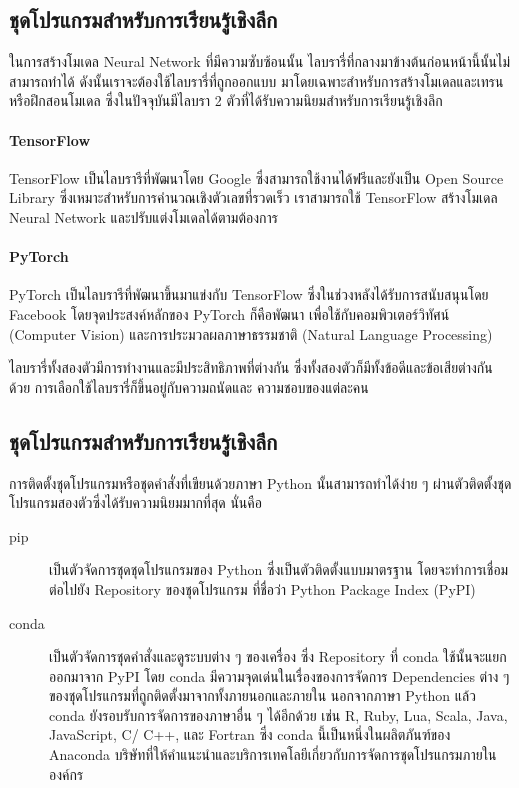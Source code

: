 \subsection{ชุดโปรแกรมสำหรับการเรียนรู้เชิงลึก}

ในการสร้างโมเดล Neural Network ที่มีความซับซ้อนนั้น ไลบรารี่ที่กลางมาข้างต้นก่อนหน้านี้นั้นไม่สามารถทำได้ ดังนั้นเราจะต้องใช้ไลบรารี่ที่ถูกออกแบบ%
มาโดยเฉพาะสำหรับการสร้างโมเดลและเทรนหรือฝึกสอนโมเดล ซึ่งในปัจจุบันมีไลบรา 2 ตัวที่ได้รับความนิยมสำหรับการเรียนรู้เชิงลึก 

\paragraph{TensorFlow}
TensorFlow เป็นไลบรารีที่พัฒนาโดย Google ซึ่งสามารถใช้งานได้ฟรีและยังเป็น Open Source Library ซึ่งเหมาะสำหรับการคำนวณเชิงตัวเลขที่รวดเร็ว 
เราสามารถใช้ TensorFlow สร้างโมเดล Neural Network และปรับแต่งโมเดลได้ตามต้องการ

\paragraph{PyTorch} 
PyTorch เป็นไลบรารีที่พัฒนาขึ้นมาแข่งกับ TensorFlow ซึ่งในช่วงหลังได้รับการสนับสนุนโดย Facebook โดยจุดประสงค์หลักของ PyTorch ก็คือพัฒนา%
เพื่อใช้กับคอมพิวเตอร์วิทัศน์ (Computer Vision) และการประมวลผลภาษาธรรมชาติ (Natural Language Processing) 

ไลบรารี่ทั้งสองตัวมีการทำงานและมีประสิทธิภาพที่ต่างกัน ซึ่งทั้งสองตัวก็มีทั้งข้อดีและข้อเสียต่างกันด้วย การเลือกใช้ไลบรารี่ก็ขึ้นอยู่กับความถนัดและ%
ความชอบของแต่ละคน

\subsection{ชุดโปรแกรมสำหรับการเรียนรู้เชิงลึก}

การติดตั้งชุดโปรแกรมหรือชุดคำสั่งที่เขียนด้วยภาษา Python นั้นสามารถทำได้ง่าย ๆ ผ่านตัวติดตั้งชุดโปรแกรมสองตัวซึ่งได้รับความนิยมมากที่สุด นั่นคือ

\begin{description}
    \item[pip] เป็นตัวจัดการชุดชุดโปรแกรมของ Python ซึ่งเป็นตัวติดตั้งแบบมาตรฐาน โดยจะทำการเชื่อมต่อไปยัง Repository ของชุดโปรแกรม%
    ที่ชื่อว่า Python Package Index (PyPI)
    \item[conda] เป็นตัวจัดการชุดคำสั่งและดูระบบต่าง ๆ ของเครื่อง ซึ่ง Repository ที่ conda ใช้นั้นจะแยกออกมาจาก PyPI โดย conda 
    มีความจุดเด่นในเรื่องของการจัดการ Dependencies ต่าง ๆ ของชุดโปรแกรมที่ถูกติดตั้งมาจากทั้งภายนอกและภายใน นอกจากภาษา Python 
    แล้ว conda ยังรอบรับการจัดการของภาษาอื่น ๆ ได้อีกด้วย เช่น R, Ruby, Lua, Scala, Java, JavaScript, C/ C++, และ Fortran
    ซึ่ง conda นี้เป็นหนึ่งในผลิตภันฑ์ของ Anaconda บริษัทที่ให้คำแนะนำและบริการเทคโลยีเกี่ยวกับการจัดการชุดโปรแกรมภายในองค์กร
\end{description}


